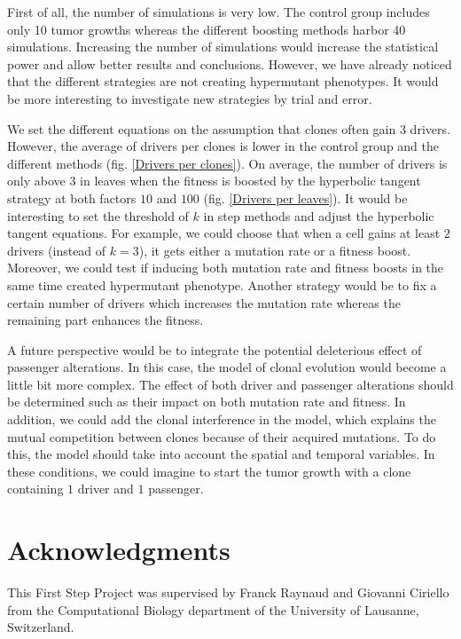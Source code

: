 \documentclass[a4paper]{article}
\begin{document}
\begin{multicols}{2}
First of all, the number of simulations is very low. The control group includes only 10 tumor growths whereas the different boosting methods harbor 40 simulations. Increasing the number of simulations would increase the statistical power and allow better results and conclusions. However, we have already noticed that the different strategies are not creating hypermutant phenotypes. It would be more interesting to investigate new strategies by trial and error. 

We set the different equations on the assumption that clones often gain 3 drivers. However, the average of drivers per clones is lower in the control group and the different methods (fig. \ref{Drivers per clones}). On average, the number of drivers is only above 3 in leaves when the fitness is boosted by the hyperbolic tangent strategy at both factors $10$ and $100$ (fig. \ref{Drivers per leaves}). It would be interesting to set the threshold of $k$ in step methods and adjust the hyperbolic tangent equations. For example, we could choose that when a cell gains at least $2$ drivers (instead of $k=3$), it gets either a mutation rate or a fitness boost. Moreover, we could test if inducing both mutation rate and fitness boosts in the same time created hypermutant phenotype. Another strategy would be to fix a certain number of drivers which increases the mutation rate whereas the remaining part enhances the fitness. 

A future perspective would be to integrate the potential deleterious effect of passenger alterations. In this case, the model of clonal evolution would become a little bit more complex. The effect of both driver and passenger alterations should be determined such as their impact on both mutation rate and fitness. In addition, we could add the clonal interference in the model, which explains the mutual competition between clones because of their acquired mutations. To do this, the model should take into account the spatial and temporal variables. In these conditions, we could imagine to start the tumor growth with a clone containing $1$ driver and $1$ passenger.












 


\section{Acknowledgments}
This First Step Project was supervised by Franck Raynaud and Giovanni Ciriello from the Computational Biology department of the University of Lausanne, Switzerland.


\end{multicols}
\end{document}
